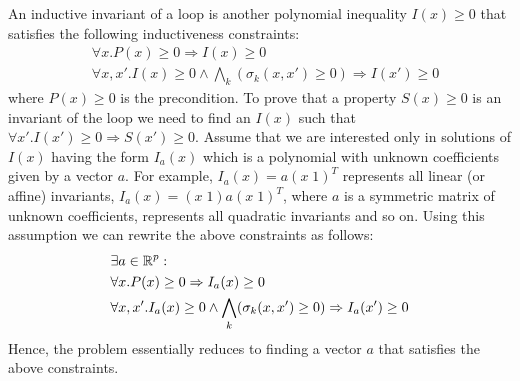 An inductive invariant of a loop is another polynomial inequality $I(x) \ge 0$ 
that satisfies the following inductiveness constraints:
%
\begin{align}
& \forall x. P(x) \ge 0 \Rightarrow I(x) \ge 0 \\
& \forall x,x'. I(x) \ge 0 \wedge \bigwedge_k (\sigma_k(x,x') \ge 0) \Rightarrow  I(x') \ge 0
\end{align}
%
where $P(x) \ge 0$ is the precondition.
To prove that a property $S(x) \ge 0$ is an invariant of the loop we need to find an $I(x)$ such that
$\forall x'. I(x') \ge 0 \Rightarrow S(x') \ge 0$.
Assume that we are interested only in solutions of $I(x)$ having the form $I_a(x)$ which is a polynomial with unknown coefficients given by a vector $a$. 
For example, $I_a(x) = a (x \; 1)^T$ represents all linear (or affine) invariants, 
$I_a(x) = (x \; 1) a (x \; 1)^T$, where $a$ is a symmetric matrix of unknown 
coefficients, represents all quadratic invariants  and so on. 
Using this assumption we can rewrite the above constraints as follows:
%
\begin{align}
& \nonumber \exists a \in \real^p:  \\
& \forall x. P(x) \ge 0 \Rightarrow I_a(x) \ge 0  \label{eq:template1}\\
& \forall x,x'. I_a(x) \ge 0  \wedge \bigwedge_k (\sigma_k(x,x') \ge 0) \Rightarrow  I_a(x') \ge 0 \label{eq:template2}
\end{align}
%
Hence,  the problem essentially reduces to finding a vector $a$ that satisfies
the above constraints.

